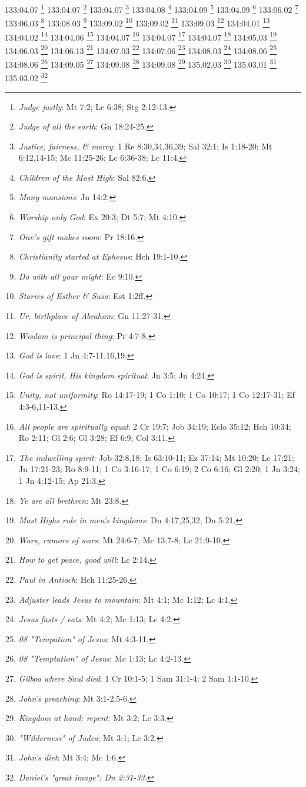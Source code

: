 {{{{{{{{{{{{{{{{{{{{{{{{{{{{{{{{133:04.07 \footnote{\textit{Judge justly}: Mt 7:2; Lc 6:38; Stg 2:12-13.}
133:04.07 \footnote{\textit{Judge of all the earth}: Gn 18:24-25.}
133:04.07 \footnote{\textit{Justice, fairness, & mercy}: 1 Re 8:30,34,36,39; Sal 32:1; Is 1:18-20; Mt 6:12,14-15; Mc 11:25-26; Lc 6:36-38; Lc 11:4.}
133:04.08 \footnote{\textit{Children of the Most High}: Sal 82:6.}
133:04.09 \footnote{\textit{Many mansions}: Jn 14:2.}
133:04.09 \footnote{\textit{Worship only God}: Ex 20:3; Dt 5:7; Mt 4:10.}
133:06.02 \footnote{\textit{One's gift makes room}: Pr 18:16.}
133:06.03 \footnote{\textit{Christianity started at Ephesus}: Hch 19:1-10.}
133:08.03 \footnote{\textit{Do with all your might}: Ec 9:10.}
133:09.02 \footnote{\textit{Stories of Esther & Susa}: Est 1:2ff.}
133:09.02 \footnote{\textit{Ur, birthplace of Abraham}: Gn 11:27-31.}
133:09.03 \footnote{\textit{Wisdom is principal thing}: Pr 4:7-8.}
134:04.01 \footnote{\textit{God is love}: 1 Jn 4:7-11,16,19.}
134:04.02 \footnote{\textit{God is spirit, His kingdom spiritual}: Jn 3:5; Jn 4:24.}
134:04.06 \footnote{\textit{Unity, not uniformity}: Ro 14:17-19; 1 Co 1:10; 1 Co 10:17; 1 Co 12:17-31; Ef 4:3-6,11-13.}
134:04.07 \footnote{\textit{All people are spiritually equal}: 2 Cr 19:7; Job 34:19; Eclo 35:12; Hch 10:34; Ro 2:11; Gl 2:6; Gl 3:28; Ef 6:9; Col 3:11.}
134:04.07 \footnote{\textit{The indwelling spirit}: Job 32:8,18; Is 63:10-11; Ez 37:14; Mt 10:20; Lc 17:21; Jn 17:21-23; Ro 8:9-11; 1 Co 3:16-17; 1 Co 6:19; 2 Co 6:16; Gl 2:20; 1 Jn 3:24; 1 Jn 4:12-15; Ap 21:3.}
134:04.07 \footnote{\textit{Ye are all brethren}: Mt 23:8.}
134:05.03 \footnote{\textit{Most Highs rule in men's kingdoms}: Dn 4:17,25,32; Dn 5:21.}
134:06.03 \footnote{\textit{Wars, rumors of wars}: Mt 24:6-7; Mc 13:7-8; Lc 21:9-10.}
134:06.13 \footnote{\textit{How to get peace, good will}: Lc 2:14.}
134:07.03 \footnote{\textit{Paul in Antioch}: Hch 11:25-26.}
134:07.06 \footnote{\textit{Adjuster leads Jesus to mountain}: Mt 4:1; Mc 1:12; Lc 4:1.}
134:08.03 \footnote{\textit{Jesus fasts / eats}: Mt 4:2; Mc 1:13; Lc 4:2.}
134:08.06 \footnote{\textit{08 "Tempation" of Jesus}: Mt 4:3-11.}
134:08.06 \footnote{\textit{08 "Temptation" of Jesus}: Mc 1:13; Lc 4:2-13.}
134:09.05 \footnote{\textit{Gilboa where Saul died}: 1 Cr 10:1-5; 1 Sam 31:1-4; 2 Sam 1:1-10.}
134:09.08 \footnote{\textit{John's preaching}: Mt 3:1-2,5-6.}
134:09.08 \footnote{\textit{Kingdom at hand; repent}: Mt 3:2; Lc 3:3.}
135.02.03 \footnote{\textit{"Wilderness" of Judea}: Mt 3:1; Lc 3:2.}
135.03.01 \footnote{\textit{John's diet}: Mt 3:4; Mc 1:6.}
135.03.02 \footnote{\textit{Daniel's "great image": Dn 2:31-33.}
}}}}}}}}}}}}}}}}}}}}}}}}}}}}}}}}}
